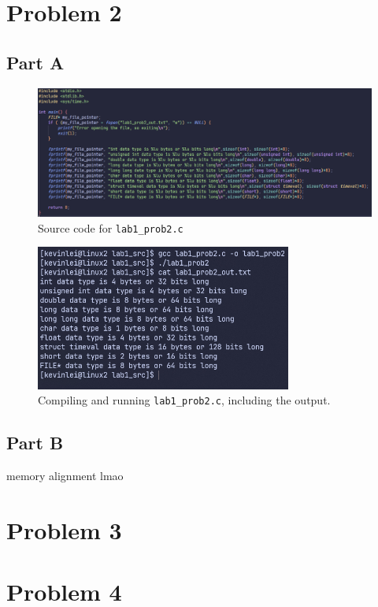 \documentclass{article}
\begin{document}
\section{Problem 2}

\subsection{Part A}
\begin{figure}[H]
    \centering
    \includegraphics[width=1\textwidth]{./images/prob2parta1.png}
    \caption{Source code for \lstinline!lab1_prob2.c!}
\end{figure}

\begin{figure}[H]
    \centering
    \includegraphics[width=0.75\textwidth]{./images/prob2parta2.png}
    \caption{Compiling and running \lstinline!lab1_prob2.c!, including the output.}
\end{figure}

\subsection{Part B}
memory alignment lmao

\section{Problem 3}

\section{Problem 4}
\end{document}
